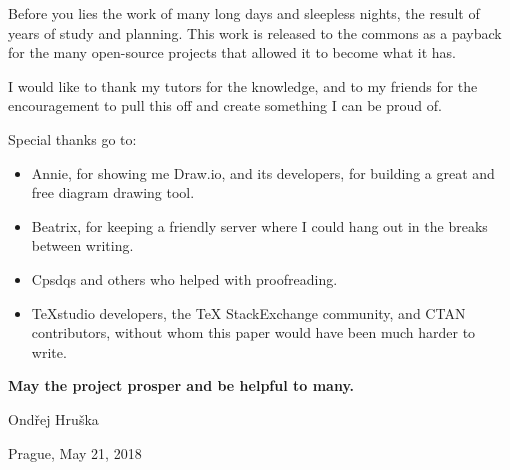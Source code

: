 \begin{thanks}

Before you lies the work of many long days and sleepless nights, the result of years of study and planning. This work is released to the commons as a payback for the many open-source projects that allowed it to become what it has.

\vspace{5pt}
I would like to thank my tutors for the knowledge, and to my friends for the encouragement to pull this off and create something I can be proud of. 

\vspace{15pt}
\noindent
Special thanks go to:

\vspace{-5pt}
\begin{itemize}
\item Annie, for showing me Draw.io, and its developers, for building a great and free diagram drawing tool.
\item Beatrix, for keeping a friendly server where I could hang out in the breaks between writing.
\item Cpsdqs and others who helped with proofreading.
\item TeXstudio developers, the TeX StackExchange community, and CTAN contributors, without whom this paper would have been much harder to write.
\end{itemize}

\vspace{5pt}
\noindent
\textbf{May the project prosper and be helpful to many.}

\vspace{25pt}
\noindent
Ondřej Hruška

\noindent
Prague, May 21, 2018

\end{thanks}
